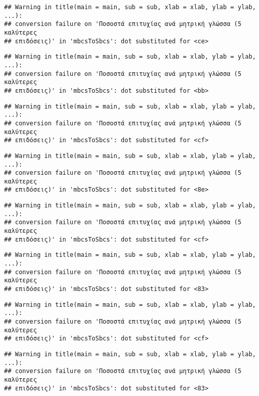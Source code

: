 \documentclass[
]{article}
\begin{document}
\begin{verbatim}
## Warning in title(main = main, sub = sub, xlab = xlab, ylab = ylab, ...):
## conversion failure on 'Ποσοστά επιτυχίας ανά μητρική γλώσσα (5 καλύτερες
## επιδόσεις)' in 'mbcsToSbcs': dot substituted for <ce>
\end{verbatim}

\begin{verbatim}
## Warning in title(main = main, sub = sub, xlab = xlab, ylab = ylab, ...):
## conversion failure on 'Ποσοστά επιτυχίας ανά μητρική γλώσσα (5 καλύτερες
## επιδόσεις)' in 'mbcsToSbcs': dot substituted for <bb>
\end{verbatim}

\begin{verbatim}
## Warning in title(main = main, sub = sub, xlab = xlab, ylab = ylab, ...):
## conversion failure on 'Ποσοστά επιτυχίας ανά μητρική γλώσσα (5 καλύτερες
## επιδόσεις)' in 'mbcsToSbcs': dot substituted for <cf>
\end{verbatim}

\begin{verbatim}
## Warning in title(main = main, sub = sub, xlab = xlab, ylab = ylab, ...):
## conversion failure on 'Ποσοστά επιτυχίας ανά μητρική γλώσσα (5 καλύτερες
## επιδόσεις)' in 'mbcsToSbcs': dot substituted for <8e>
\end{verbatim}

\begin{verbatim}
## Warning in title(main = main, sub = sub, xlab = xlab, ylab = ylab, ...):
## conversion failure on 'Ποσοστά επιτυχίας ανά μητρική γλώσσα (5 καλύτερες
## επιδόσεις)' in 'mbcsToSbcs': dot substituted for <cf>
\end{verbatim}

\begin{verbatim}
## Warning in title(main = main, sub = sub, xlab = xlab, ylab = ylab, ...):
## conversion failure on 'Ποσοστά επιτυχίας ανά μητρική γλώσσα (5 καλύτερες
## επιδόσεις)' in 'mbcsToSbcs': dot substituted for <83>
\end{verbatim}

\begin{verbatim}
## Warning in title(main = main, sub = sub, xlab = xlab, ylab = ylab, ...):
## conversion failure on 'Ποσοστά επιτυχίας ανά μητρική γλώσσα (5 καλύτερες
## επιδόσεις)' in 'mbcsToSbcs': dot substituted for <cf>
\end{verbatim}

\begin{verbatim}
## Warning in title(main = main, sub = sub, xlab = xlab, ylab = ylab, ...):
## conversion failure on 'Ποσοστά επιτυχίας ανά μητρική γλώσσα (5 καλύτερες
## επιδόσεις)' in 'mbcsToSbcs': dot substituted for <83>
\end{verbatim}
\end{document}
